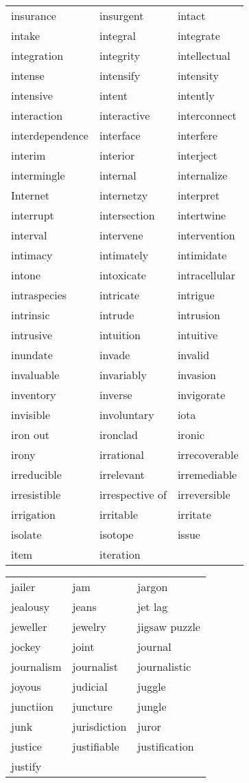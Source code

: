 \documentclass{minimal}
\begin{document}
\begin{longtable}{p{2.8cm}p{2.8cm}p{2.8cm}}
insurance & insurgent & intact \\
intake & integral & integrate \\
integration & integrity & intellectual \\
intense & intensify & intensity \\
intensive & intent & intently \\
interaction & interactive & interconnect \\
interdependence & interface & interfere \\
interim & interior & interject \\
intermingle & internal & internalize \\
Internet & internetzy & interpret \\
interrupt & intersection & intertwine \\
interval & intervene & intervention \\
intimacy & intimately & intimidate \\
intone & intoxicate & intracellular \\
intraspecies & intricate & intrigue \\
intrinsic & intrude & intrusion \\
intrusive & intuition & intuitive \\
inundate & invade & invalid \\
invaluable & invariably & invasion \\
inventory & inverse & invigorate \\
invisible & involuntary & iota \\
iron out & ironclad & ironic \\
irony & irrational & irrecoverable \\
irreducible & irrelevant & irremediable \\
irresistible & irrespective of & irreversible \\
irrigation & irritable & irritate \\
isolate & isotope & issue \\
item & iteration
\end{longtable}

\begin{longtable}{p{2.8cm}p{2.8cm}p{2.8cm}}
jailer & jam & jargon \\
jealousy & jeans & jet lag \\
jeweller & jewelry & jigsaw puzzle \\
jockey & joint & journal \\
journalism & journalist & journalistic \\
joyous & judicial & juggle \\
junctiion & juncture & jungle \\
junk & jurisdiction & juror \\
justice & justifiable & justification \\
justify
\end{longtable}
\end{document}
